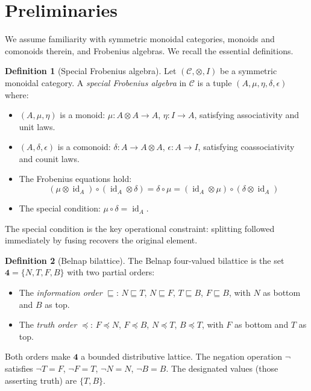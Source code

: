 \documentclass[11pt,a4paper]{article}
\theoremstyle{definition}
\newtheorem{definition}{Definition}[section]
\newcommand{\cat}[1]{\mathcal{#1}}
\newcommand{\id}{\operatorname{id}}
\begin{document}
\section{Preliminaries}

We assume familiarity with symmetric monoidal categories, monoids and comonoids therein, and Frobenius algebras. We recall the essential definitions.

\begin{definition}[Special Frobenius algebra]
Let $(\cat{C}, \otimes, I)$ be a symmetric monoidal category. A \emph{special Frobenius algebra} in $\cat{C}$ is a tuple $(A, \mu, \eta, \delta, \epsilon)$ where:
\begin{itemize}
\item $(A, \mu, \eta)$ is a monoid: $\mu : A \otimes A \to A$, $\eta : I \to A$, satisfying associativity and unit laws.
\item $(A, \delta, \epsilon)$ is a comonoid: $\delta : A \to A \otimes A$, $\epsilon : A \to I$, satisfying coassociativity and counit laws.
\item The Frobenius equations hold:
\[
(\mu \otimes \id_A) \circ (\id_A \otimes \delta) = \delta \circ \mu = (\id_A \otimes \mu) \circ (\delta \otimes \id_A)
\]
\item The special condition: $\mu \circ \delta = \id_A$.
\end{itemize}
\end{definition}

The special condition is the key operational constraint: splitting followed immediately by fusing recovers the original element.

\begin{definition}[Belnap bilattice]
The Belnap four-valued bilattice is the set $\mathbf{4} = \{N, T, F, B\}$ with two partial orders:
\begin{itemize}
\item The \emph{information order} $\sqsubseteq$: $N \sqsubseteq T$, $N \sqsubseteq F$, $T \sqsubseteq B$, $F \sqsubseteq B$, with $N$ as bottom and $B$ as top.
\item The \emph{truth order} $\preceq$: $F \preceq N$, $F \preceq B$, $N \preceq T$, $B \preceq T$, with $F$ as bottom and $T$ as top.
\end{itemize}
Both orders make $\mathbf{4}$ a bounded distributive lattice. The negation operation $\neg$ satisfies $\neg T = F$, $\neg F = T$, $\neg N = N$, $\neg B = B$. The designated values (those asserting truth) are $\{T, B\}$.
\end{definition}
\end{document}
